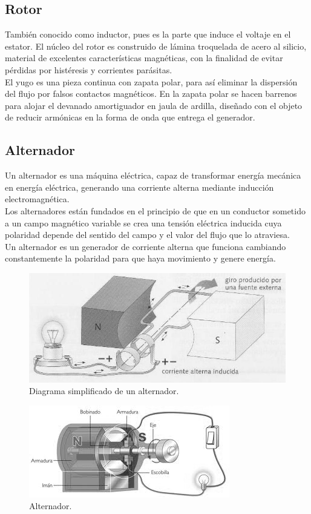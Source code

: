 \documentclass[11pt]{article}
\begin{document}
\subsection*{Rotor}
\noindent
También conocido como inductor, pues es la parte que induce el voltaje en el estator. El núcleo del rotor es construido de lámina troquelada de acero al silicio, material de excelentes características magnéticas, con la finalidad de evitar pérdidas por histéresis y corrientes parásitas.\\
El yugo es una pieza continua con zapata polar, para así eliminar la dispersión del flujo por falsos contactos magnéticos. En la zapata polar se hacen barrenos para alojar el devanado amortiguador en jaula de ardilla, diseñado con el objeto de reducir armónicas en la forma de onda que entrega el generador.

\subsection{Alternador}
\noindent
Un alternador es una máquina eléctrica, capaz de transformar energía mecánica en energía eléctrica, generando una corriente alterna mediante inducción electromagnética.\\
Los alternadores están fundados en el principio de que en un conductor sometido a un campo magnético variable se crea una tensión eléctrica inducida cuya polaridad depende del sentido del campo y el valor del flujo que lo atraviesa.\\
Un alternador es un generador de corriente alterna que funciona cambiando constantemente la polaridad para que haya movimiento y genere energía.
\begin{figure}[H]
  \centering
  \includegraphics[scale=0.5]{alternador1.png}
    \caption{Diagrama simplificado de un alternador.}
  \label{fig4}
\end{figure}
\begin{figure}[H]
  \centering
  \includegraphics[scale=1]{alternador2.png}
    \caption{Alternador.}
  \label{fig5}
\end{figure}
\end{document}
